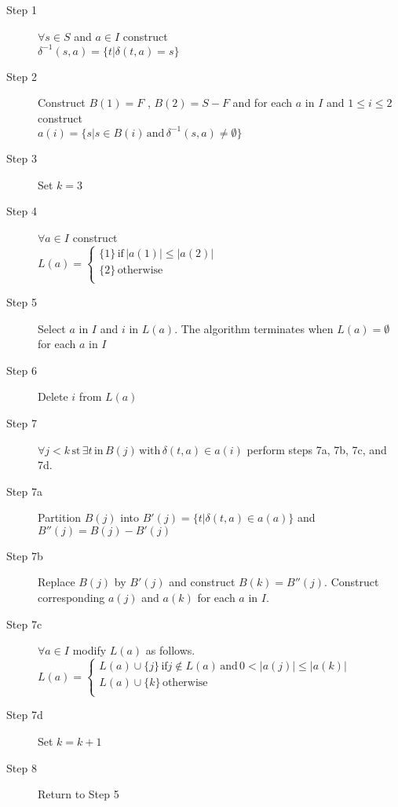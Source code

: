 \begin{description}
\item[Step 1]    $\forall s \in S$ and $a \in I$ construct  \\
                     $\delta^{-1} (s,a) = \{ t | \delta (t,a) = s \}$
\item[Step 2]    Construct $B(1) = F$ , $B(2) = S-F$ and for each $a$ in $I$ and $1 \leq i \leq 2$ construct  \\
                     $a(i) = \{ s | s \in B(i) \, \textrm{and} \, \delta^{-1} (s,a) \neq \emptyset \} $
\item[Step 3]    Set $k=3$
\item[Step 4]    $ \forall a \in I$ construct  \\
                     $L(a) = \left\{
                               \begin{array}{l}
                                 \{ 1 \} \, \textrm{if} \, | a(1) | \leq | a(2) | \\
                                 \{ 2 \} \, \textrm{otherwise} \, \\
                               \end{array}
                             \right. $
\item[Step 5]    Select $a$ in $I$ and $i$ in $L(a)$. The algorithm terminates when $L(a) = \emptyset$ for each
                 $a$ in $I$
\item[Step 6]    Delete $i$ from $L(a)$
\item[Step 7]    $\forall j < k \, \textrm{st} \, \exists t \, \textrm{in} \, B(j) \, \textrm{with} \, \delta (t,a) \in a(i)$
                 perform steps 7a, 7b, 7c, and 7d.
\item[Step 7a]   Partition $B(j)$ into $B'(j) = \{ t | \delta (t,a) \in a(a) \}$ and $B''(j) = B(j) - B'(j)$
\item[Step 7b]   Replace $B(j)$ by $B'(j)$ and construct $B(k) = B''(j)$. Construct corresponding $a(j)$ and $a(k)$
                 for each $a$ in $I$.
\item[Step 7c]   $\forall a \in I$ modify $L(a)$ as follows.  \\
                   $L(a) = \left\{
                             \begin{array}{l}
                               L(a) \cup \{ j \}  \, \textrm{if} j \notin L(a) \, \textrm{and} \, 0 < |a(j)| \leq |a(k)|  \\
                               L(a) \cup \{ k \}  \, \textrm{otherwise}  \\
                             \end{array}
                           \right. $
\item[Step 7d]   Set $k=k+1$
\item[Step 8]    Return to Step 5
\end{description}
